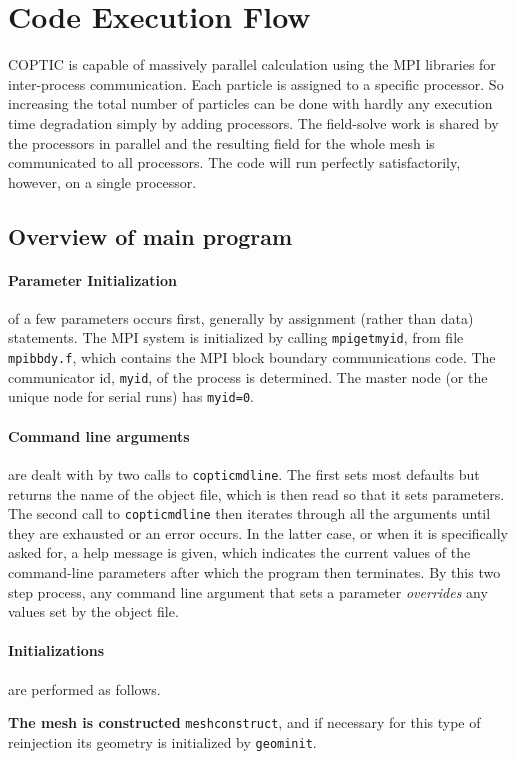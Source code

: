 \documentclass[12pt]{article}
\def\sentence#1{\par\noindent\textbf{#1}}
\begin{document}
\section{Code Execution Flow}

COPTIC is capable of massively parallel calculation using the MPI
libraries for inter-process communication. Each particle is assigned
to a specific processor. So increasing the total number of particles
can be done with hardly any execution time degradation simply by
adding processors. The field-solve work is shared by the processors in
parallel and the resulting field for the whole mesh is communicated to
all processors. The code will run perfectly satisfactorily, however,
on a single processor.

\subsection{Overview of main program}

\paragraph{Parameter Initialization} of a few parameters occurs
first, generally by assignment (rather than data) statements. The MPI
system is initialized by calling \verb!mpigetmyid!, from file
\verb!mpibbdy.f!, which contains the MPI block boundary communications
code. The communicator id, \verb!myid!, of the process is
determined. The master node (or the unique node for serial runs) has
\verb!myid=0!. 

\paragraph{Command line arguments} are dealt with by two calls to
\verb!copticmdline!. The first sets most defaults but returns the name
of the object file, which is then read so that it sets parameters.
The second call to \verb!copticmdline! then iterates through all the
arguments until they are exhausted or an error occurs. In the latter case,
or when it is specifically asked for, a help message is given, which
indicates the current values of the command-line parameters after
which the program then terminates. By this two step process, any
command line argument that sets a parameter \emph{overrides} any
values set by the object file.

\paragraph{Initializations} are performed as follows.
\sentence{The mesh is constructed} \verb!meshconstruct!, and if
necessary for this type of reinjection its geometry is initialized
by \verb!geominit!.
\end{document}
